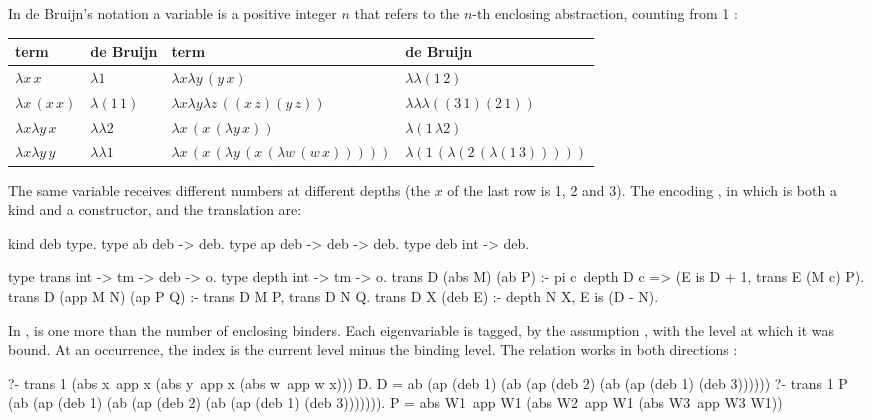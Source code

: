 {{In de Bruijn's notation \cite{deBruijn1972} a variable is a positive integer $n$ that refers to the $n$-th
enclosing abstraction, counting from 1 :
\begin{center}
\begin{tabular}{@{}ll@{\qquad}ll@{}}
\toprule
term & de Bruijn & term & de Bruijn\\
\midrule
$\lambda x\,x$ & $\lambda 1$ & $\lambda x\lambda y\,(y\,x)$ & $\lambda\lambda(1\,2)$\\
$\lambda x\,(x\,x)$ & $\lambda(1\,1)$ & $\lambda x\lambda y\lambda z\,((x\,z)(y\,z))$ & $\lambda\lambda\lambda((3\,1)(2\,1))$\\
$\lambda x\lambda y\,x$ & $\lambda\lambda2$ & $\lambda x\,(x\,(\lambda y\,x))$ & $\lambda(1\,\lambda2)$\\
$\lambda x\lambda y\,y$ & $\lambda\lambda1$ & $\lambda x\,(x\,(\lambda y\,(x\,(\lambda w\,(w\,x)))))$ & $\lambda(1\,(\lambda(2\,(\lambda(1\,3)))))$\\
\bottomrule
\end{tabular}
\end{center}
The same variable receives different numbers at different depths (the $x$ of the last row is 1, 2 and 3).
The encoding , in which  is both a kind and a constructor, and the translation are:
\begin{lprolog}
kind deb  type.
type ab   deb -> deb.
type ap   deb -> deb -> deb.
type deb  int -> deb.
\end{lprolog}
\begin{lprolog}
type trans  int -> tm -> deb -> o.
type depth  int -> tm -> o.
trans D (abs M) (ab P) :- pi c\ depth D c =>
                            (E is D + 1, trans E (M c) P).
trans D (app M N) (ap P Q) :- trans D M P, trans D N Q.
trans D X (deb E) :- depth N X, E is (D - N).
\end{lprolog}
In ,  is one more than the number of enclosing binders. Each eigenvariable is tagged, by
the assumption , with the level at which it was bound. At an occurrence, the index is the current
level minus the binding level. The relation works in both directions :
\begin{lprolog}
?- trans 1 (abs x\ app x (abs y\ app x (abs w\ app w x))) D.
D = ab (ap (deb 1) (ab (ap (deb 2) (ab (ap (deb 1) (deb 3))))))
?- trans 1 P
     (ab (ap (deb 1) (ab (ap (deb 2) (ab (ap (deb 1) (deb 3))))))).
P = abs W1\ app W1 (abs W2\ app W1 (abs W3\ app W3 W1))
\end{lprolog}

}}
